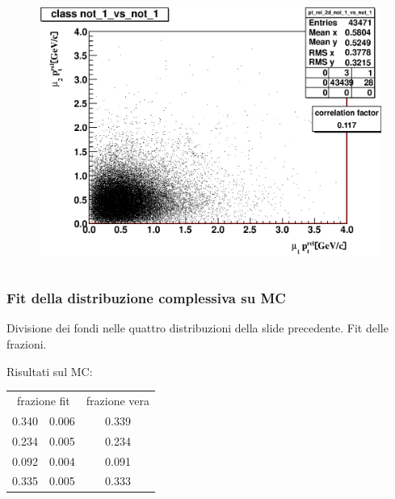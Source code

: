 \documentclass[italian]{beamer}
\begin{document}
\begin{frame}
\begin{columns}
\begin{column}{.5\textwidth}
\begin{figure}[h]
            \end{figure}
            \begin{figure}[h]
                \centering
                \includegraphics[width=.7\textwidth]{pt_rel_2d_not_1_vs_not_1.eps}
            \end{figure}
        \end{column}
    \end{columns}
\end{frame}
\begin{frame}
    \frametitle{Fit della distribuzione complessiva su MC}
    Divisione dei fondi nelle quattro distribuzioni della slide precedente.
    Fit delle frazioni.

    Risultati sul MC:
    \begin{table}
        \centering
        \begin{tabular}{r@{$\pm$}l c}
            \multicolumn{2}{c}{frazione fit} & frazione vera\\
            0.340 & 0.006 & 0.339\\
            0.234 & 0.005 & 0.234\\
            0.092 & 0.004 & 0.091\\
            0.335 & 0.005 & 0.333\\ 
        \end{tabular}
    \end{table}
\end{frame}
\end{document}
